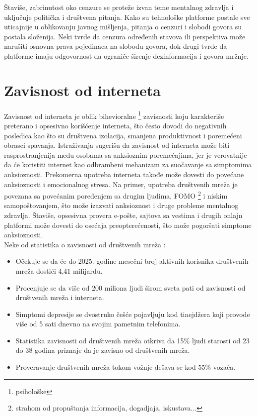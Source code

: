 \documentclass[a4paper]{article}
\begin{document}
            Štaviše, zabrinutost oko cenzure se proteže izvan teme mentalnog zdravlja i uključuje politička i društvena pitanja. Kako su tehnološke platforme postale sve uticajnije u oblikovanju javnog mišljenja, pitanja o cenzuri i slobodi govora su postala složenija. Neki tvrde da cenzura određenih stavova ili perspektiva može narušiti osnovna prava pojedinaca na slobodu govora, dok drugi tvrde da platforme imaju odgovornost da ograniče širenje dezinformacija i govora mržnje.
        \section{Zavisnost od interneta}
	\label{sec:podnaslov3}
            Zavisnost od interneta je oblik bihevioralne \footnote{psihološke} zavisnosti koju karakteriše preterano i opsesivno korišćenje interneta, što često dovodi do negativnih posledica kao što su društvena izolacija, smanjena produktivnost i poremećeni obrasci spavanja. Istraživanja sugerišu da zavisnost od interneta može biti rasprostranjenija među osobama sa anksioznim poremećajima, jer je verovatnije da će koristiti internet kao odbrambeni mehanizam za suočavanje sa simptomima anksioznosti. \cite{cetvrta} 
            Prekomerna upotreba interneta takođe može dovesti do povećane anksioznosti i emocionalnog stresa. Na primer, upotreba društvenih mreža je povezana sa povećanim poređenjem sa drugim ljudima, FOMO \footnote{strahom od propuštanja informacija, dogadjaja, iskustava...} i niskim samopoštovanjem, što može izazvati anksioznost i druge probleme mentalnog zdravlja. Štaviše, opsesivna provera e-pošte, sajtova sa vestima i drugih onlajn platformi može dovesti do osećaja preopterećenosti, što može pogoršati simptome anksioznosti. \\ \newline
            Neke od statistika o zavisnosti od društvenih mreža\cite{peta} :
            \begin{itemize}
		 	\item Očekuje se da će do 2025. godine mesečni broj aktivnih korisnika društvenih mreža dostići 4,41 milijardu.
		 	\item Procenjuje se da više od 200 miliona ljudi širom sveta pati od zavisnosti od društvenih mreža i interneta.
		 	\item Simptomi depresije se dvostruko češće pojavljuju kod tinejdžera koji provode više od 5 sati dnevno na svojim pametnim telefonima.
		 	\item Statistika zavisnosti od društvenih mreža otkriva da 15\% ljudi starosti od 23 do 38 godina priznaje da je zavisno od društvenih mreža.
		 	\item Proveravanje društvenih mreža tokom vožnje dešava se kod 55\% vozača.
            \end{itemize}  
\end{document}
